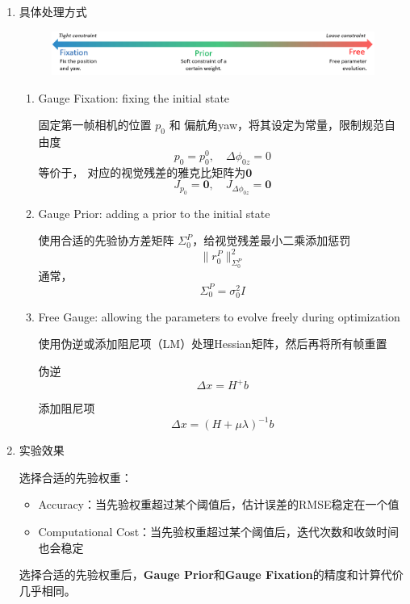 \documentclass[12pt,a4paper]{article}
\begin{document}
\begin{enumerate}

\item 具体处理方式

\begin{figure}[htbp] 
	\centering
	\includegraphics[width=15cm]{vio_gauge_freedom.png}
\end{figure} 

\begin{enumerate}

\item Gauge Fixation: fixing the initial state

固定第一帧相机的位置 $p_0$ 和 偏航角yaw，将其设定为常量，限制规范自由度
$$
p_0 = p_0^0, \quad \Delta \phi_{0z} = 0
$$
等价于， 对应的视觉残差的雅克比矩阵为$\mathbf{0}$
$$
J_{p_0} = \mathbf{0}, \quad J_{\Delta \phi_{0z}} = \mathbf{0}
$$

\item Gauge Prior: adding a prior to the initial state

使用合适的先验协方差矩阵 $\Sigma_0^P$，给视觉残差最小二乘添加惩罚
$$
\|r_0^P\|^2_{\Sigma_0^P}
$$
通常，
$$
\Sigma_0^P = \sigma_0^2 I
$$

\item Free Gauge: allowing the parameters to evolve freely during optimization

使用伪逆或添加阻尼项（LM）处理Hessian矩阵，然后再将所有帧重置

伪逆
$$
\Delta x = H^{+} b
$$

添加阻尼项
$$
\Delta x = (H + \mu \lambda)^{-1} b
$$

\end{enumerate}

\item 实验效果

选择合适的先验权重：
\begin{itemize}
\item Accuracy：当先验权重超过某个阈值后，估计误差的RMSE稳定在一个值
\item Computational Cost：当先验权重超过某个阈值后，迭代次数和收敛时间也会稳定
\end{itemize}

选择合适的先验权重后，\textbf{Gauge Prior}和\textbf{Gauge Fixation}的精度和计算代价几乎相同。


\end{enumerate}
\end{document}

